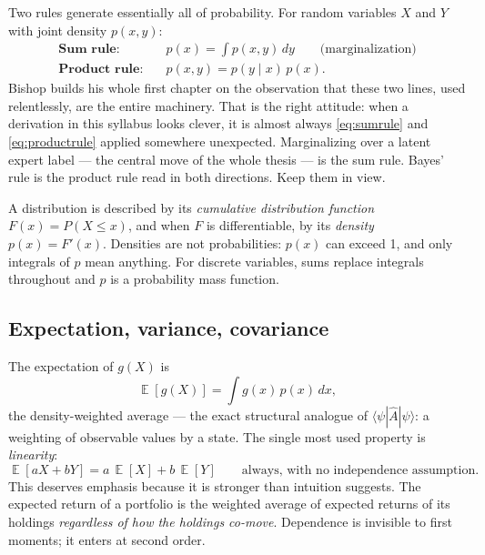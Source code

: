 \documentclass[11pt]{article}
\numberwithin{equation}{section}
\theoremstyle{plain}
\theoremstyle{definition}
\theoremstyle{remark}
\DeclareMathOperator{\E}{\mathbb{E}}
\begin{document}
Two rules generate essentially all of probability. For random variables $X$ and $Y$ with joint density $p(x,y)$:
\begin{align}
\textbf{Sum rule:}\quad & p(x) = \int p(x,y)\,dy
\qquad\text{(marginalization)} \label{eq:sumrule}\\
\textbf{Product rule:}\quad & p(x,y) = p(y \mid x)\, p(x). \label{eq:productrule}
\end{align}
Bishop builds his whole first chapter on the observation that these two lines, used relentlessly, are the entire machinery. That is the right attitude: when a derivation in this syllabus looks clever, it is almost always \eqref{eq:sumrule} and \eqref{eq:productrule} applied somewhere unexpected. Marginalizing over a latent expert label --- the central move of the whole thesis --- is the sum rule. Bayes' rule is the product rule read in both directions. Keep them in view.

A distribution is described by its \emph{cumulative distribution function} $F(x) = P(X \le x)$, and when $F$ is differentiable, by its \emph{density} $p(x) = F'(x)$. Densities are not probabilities: $p(x)$ can exceed 1, and only integrals of $p$ mean anything. For discrete variables, sums replace integrals throughout and $p$ is a probability mass function.

\subsection{Expectation, variance, covariance}

The expectation of $g(X)$ is
\begin{equation}
\E[g(X)] = \int g(x)\, p(x)\, dx,
\end{equation}
the density-weighted average --- the exact structural analogue of $\langle \psi | \hat{A} | \psi \rangle$: a weighting of observable values by a state. The single most used property is \emph{linearity}:
\begin{equation}
\E[aX + bY] = a\,\E[X] + b\,\E[Y] \qquad \text{always, with no independence assumption.}
\label{eq:linearity}
\end{equation}
This deserves emphasis because it is stronger than intuition suggests. The expected return of a portfolio is the weighted average of expected returns of its holdings \emph{regardless of how the holdings co-move}. Dependence is invisible to first moments; it enters at second order.
\end{document}
